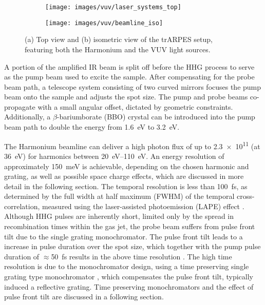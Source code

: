 \begin{figure}
	\centering
	\begin{subfigure}[b]{0.45\textwidth}
		\texttt{[image: images/vuv/laser\_systems\_top]}
		\caption{}
	\end{subfigure}
	\begin{subfigure}[b]{0.45\textwidth}
		\texttt{[image: images/vuv/beamline\_iso]}
		\caption{}
	\end{subfigure}
	\caption{(a) Top view and (b) isometric view of the trARPES setup, featuring both the Harmonium and the VUV light sources.}
	\label{fig:beamline_cad}
\end{figure}

A portion of the amplified IR beam is split off before the HHG process to serve as the pump beam used to excite the sample.
After compensating for the probe beam path, a telescope system consisting of two curved mirrors focuses the pump beam onto the sample and adjusts the spot size.
The pump and probe beams co-propagate with a small angular offset, dictated by geometric constraints.
Additionally, a $\beta$-bariumborate (BBO) crystal can be introduced into the pump beam path to double the energy from \qty{1.6}{\electronvolt} to \qty{3.2}{\electronvolt}.

The Harmonium beamline can deliver a high photon flux of up to \qty{2.3e11}{\pps} (at \qty{36}{\electronvolt}) for harmonics between \qtyrange{20}{110}{\electronvolt}.
An energy resolution of approximately \qty{150}{\milli\electronvolt} is achievable, depending on the chosen harmonic and grating, as well as possible space charge effects, which are discussed in more detail in the following section.
The temporal resolution is less than \qty{100}{\femto\second}, as determined by the full width at half maximum (FWHM) of the temporal cross-correlation, measured using the laser-assisted photoemission (LAPE) effect \cite{ojeda_harmonium_2015}.
Although HHG pulses are inherently short, limited only by the spread in recombination times within the gas jet, the probe beam suffers from pulse front tilt due to the single grating monochromator.
The pulse front tilt leads to a increase in pulse duration over the spot size, which together with the pump pulse duration of $\approx$\qty{50}{\femto\second} results in the above time resolution \cite{arrell_harmonium_2017}.
The high time resolution is due to the monochromator design, using a time preserving single grating type monochromator \cite{poletto_time-preserving_2010}, which compensates the pulse front tilt, typically induced a reflective grating.
Time preserving monochromators and the effect of pulse front tilt are discussed in a following section.

